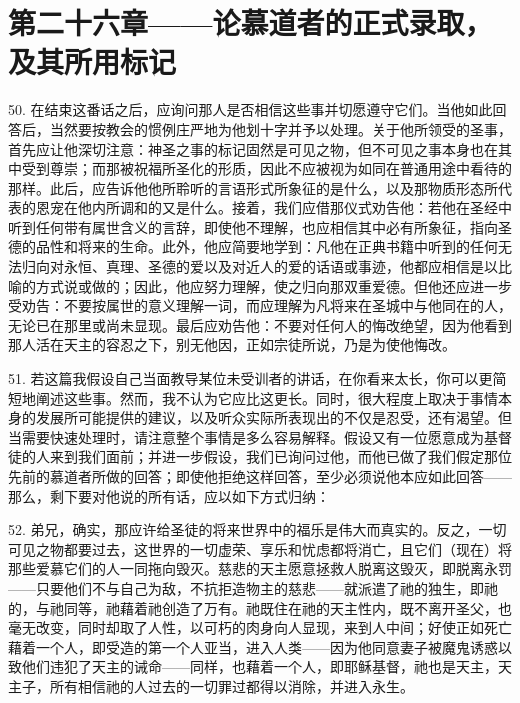 
\section{第二十六章——论慕道者的正式录取，及其所用标记}

50. 在结束这番话之后，应询问那人是否相信这些事并切愿遵守它们。当他如此回答后，当然要按教会的惯例庄严地为他划十字并予以处理。关于他所领受的圣事，首先应让他深切注意：神圣之事的标记固然是可见之物，但不可见之事本身也在其中受到尊崇；而那被祝福所圣化的形质，因此不应被视为如同在普通用途中看待的那样。此后，应告诉他他所聆听的言语形式所象征的是什么，以及那物质形态所代表的恩宠在他内所调和的又是什么。接着，我们应借那仪式劝告他：若他在圣经中听到任何带有属世含义的言辞，即使他不理解，也应相信其中必有所象征，指向圣德的品性和将来的生命。此外，他应简要地学到：凡他在正典书籍中听到的任何无法归向对永恒、真理、圣德的爱以及对近人的爱的话语或事迹，他都应相信是以比喻的方式说或做的；因此，他应努力理解，使之归向那双重爱德。但他还应进一步受劝告：不要按属世的意义理解一词，而应理解为凡将来在圣城中与他同在的人，无论已在那里或尚未显现。最后应劝告他：不要对任何人的悔改绝望，因为他看到那人活在天主的容忍之下，别无他因，正如宗徒所说，乃是为使他悔改。\par

51. 若这篇我假设自己当面教导某位未受训者的讲话，在你看来太长，你可以更简短地阐述这些事。然而，我不认为它应比这更长。同时，很大程度上取决于事情本身的发展所可能提供的建议，以及听众实际所表现出的不仅是忍受，还有渴望。但当需要快速处理时，请注意整个事情是多么容易解释。假设又有一位愿意成为基督徒的人来到我们面前；并进一步假设，我们已询问过他，而他已做了我们假定那位先前的慕道者所做的回答；即使他拒绝这样回答，至少必须说他本应如此回答——那么，剩下要对他说的所有话，应以如下方式归纳：\par

52. 弟兄，确实，那应许给圣徒的将来世界中的福乐是伟大而真实的。反之，一切可见之物都要过去，这世界的一切虚荣、享乐和忧虑都将消亡，且它们（现在）将那些爱慕它们的人一同拖向毁灭。慈悲的天主愿意拯救人脱离这毁灭，即脱离永罚——只要他们不与自己为敌，不抗拒造物主的慈悲——就派遣了祂的独生，即祂的，与祂同等，祂藉着祂创造了万有。祂既住在祂的天主性内，既不离开圣父，也毫无改变，同时却取了人性，以可朽的肉身向人显现，来到人中间；好使正如死亡藉着一个人，即受造的第一个人亚当，进入人类——因为他同意妻子被魔鬼诱惑以致他们违犯了天主的诫命——同样，也藉着一个人，即耶稣基督，祂也是天主，天主子，所有相信祂的人过去的一切罪过都得以消除，并进入永生。\par

